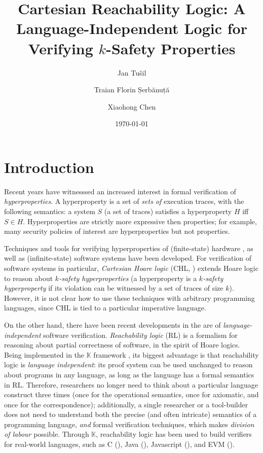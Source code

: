\documentclass{article}
\title{Cartesian Reachability Logic: A Language-Independent Logic for Verifying $k$-Safety Properties}
\author{Jan Tu\v{s}il  \and Traian Florin Șerbănuță \and Xiaohong Chen
}
\date{\today}
\newcommand{\K}{$\mathbb{K}$}
\begin{document}
\maketitle

\section{Introduction}
Recent years have witnesssed an increased interest in formal verification of \emph{hyperproperties}.
A hyperproperty is a set of \emph{sets of} execution traces, with the following semantics:
a system $S$ (a set of traces) satisfies a hyperproperty $H$ iff $S \in H$.
Hyperproperties are strictly more expressive then properties; for example, many security policies
of interest are hyperproperties but not properties.

Techniques and tools for verifying hyperproperties of (finite-state) hardware \cite{CoenenFST19,FinkbeinerRS15},
as well as (infinite-state) software systems have been developed.
For verification of software systems in particular, \emph{Cartesian Hoare logic} (CHL, \cite{SousaD16}) extends Hoare logic
to reason about \emph{$k$-safety hyperproperties}
(a hyperproperty is a \emph{$k$-safety hyperproperty} if its violation can be witnessed
by a set of traces of size $k$).
However, it is not clear how to use these techniques with arbitrary programming languages,
since CHL is tied to a particular imperative language.

On the other hand, there have been recent developments in the are of \emph{language-independent} software verification.
\emph{Reachability logic} (RL) \cite{RosuS12oopsla,RosuSCM13lics,StefanescuCMMSR19}
is a
formalism for reasoning about partial correctness of software, in the spirit of Hoare logics.
Being implemented in the \K{} framework \cite{KVision},
its biggest advantage is that reachability logic is \emph{language independent}:
its proof system can be used unchanged to reason about programs in any language,
as long as the language has a formal semantics in RL.
Therefore, researchers no longer need to think about a particular language construct three times
(once for the operational semantics, once for axiomatic, and once for the correspondence);
additionally, a single researcher or a tool-builder does not need to understand both the precise (and often intricate)
semantics of a programming language, \emph{and} formal verification techniques,
which makes \emph{division of labour} possible.
Through \K{}, reachability logic has been used to build verifiers for real-world languages,
such as C (\cite{RVMatch}), Java (\cite{StefanescuPYLR16VerifiersForAll}), Javascript (\cite{StefanescuPYLR16VerifiersForAll}),
and EVM (\cite{KevmVerificationTool}).
\end{document}
